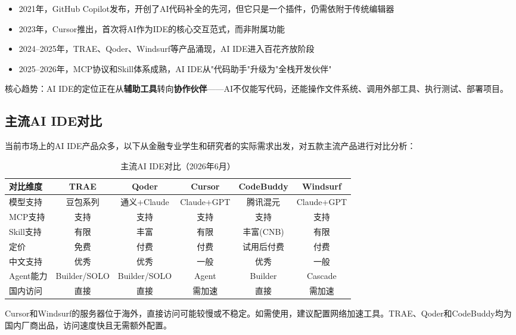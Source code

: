 \begin{theorybox}
\begin{itemize}[leftmargin=2em]
  \item 2021年，GitHub Copilot发布，开创了AI代码补全的先河，但它只是一个插件，仍需依附于传统编辑器
  \item 2023年，Cursor推出，首次将AI作为IDE的核心交互范式，而非附属功能
  \item 2024--2025年，TRAE、Qoder、Windsurf等产品涌现，AI IDE进入百花齐放阶段
  \item 2025--2026年，MCP协议和Skill体系成熟，AI IDE从"代码助手"升级为"全栈开发伙伴"
\end{itemize}
核心趋势：AI IDE的定位正在从\textbf{辅助工具}转向\textbf{协作伙伴}——AI不仅能写代码，还能操作文件系统、调用外部工具、执行测试、部署项目。
\end{theorybox}

\subsection{主流AI IDE对比}

当前市场上的AI IDE产品众多，以下从金融专业学生和研究者的实际需求出发，对五款主流产品进行对比分析：

\begin{table}[H]
\centering
\small
\begin{tabular}{lccccc}
\toprule
\textbf{对比维度} & \textbf{TRAE} & \textbf{Qoder} & \textbf{Cursor} & \textbf{CodeBuddy} & \textbf{Windsurf} \\
\midrule
模型支持 & 豆包系列 & 通义+Claude & Claude+GPT & 腾讯混元 & Claude+GPT \\
MCP支持 & 支持 & 支持 & 支持 & 支持 & 支持 \\
Skill支持 & 有限 & 丰富 & 有限 & 丰富(CNB) & 有限 \\
定价 & 免费 & 付费 & 付费 & 试用后付费 & 付费 \\
中文支持 & 优秀 & 优秀 & 一般 & 优秀 & 一般 \\
Agent能力 & Builder/SOLO & Builder/SOLO & Agent & Builder & Cascade \\
国内访问 & 直接 & 直接 & 需加速 & 直接 & 需加速 \\
\bottomrule
\end{tabular}
\caption{主流AI IDE对比（2026年6月）}
\end{table}

\begin{notebox}[关于"国内访问"]
Cursor和Windsurf的服务器位于海外，直接访问可能较慢或不稳定。如需使用，建议配置网络加速工具。TRAE、Qoder和CodeBuddy均为国内厂商出品，访问速度快且无需额外配置。
\end{notebox}


